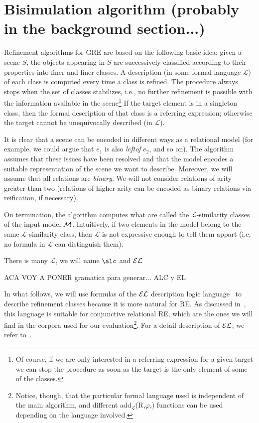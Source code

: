 \section{Bisimulation algorithm (probably in the background section...)}

Refinement algorithms for GRE are based on the following basic idea: given a 
scene $S$, the objects appearing in $S$ are successively classified according
to their properties into finer and finer classes. A description (in some formal language $\mathcal{L}$)  of each 
class is computed every time a class is refined. The procedure always stops when the 
set of classes stabilizes, i.e., no further refinement is possible with the information 
available in the scene\footnote{Of course, if we are only interested in a referring expression for 
a given target we can stop the procedure as soon as the target is the only element of some of the classes.}
If the target element is in a singleton class, then 
the formal description of that class is a referring expression; otherwise the 
target cannot be unequivocally described (in $\mathcal{L}$).  

It is clear that a scene can be encoded in different ways as a relational model (for example, we could argue that $e_1$ is also \emph{leftof} $e_2$, and so on).  The algorithm assumes that these issues have been resolved and that the model encodes a suitable representation of the scene we want to describe.  Moreover, we will assume that all relations are \emph{binary}.  We will not consider relations of arity greater than two (relations of higher arity can be encoded as binary relations via reification, if necessary).

On termination, the algorithm computes what are called the $\mathcal{L}$-similarity classes of the input model $\mathcal{M}$. Intuitively, if two elements in the model belong to the same $\mathcal{L}$-similarity class, then $\mathcal{L}$ is not expressive enough to tell them appart (i.e, no formula in $\mathcal{L}$ can distinguish them). 

There is many $\mathcal{L}$, we will name $\alc$ and $\mathcal{EL}$

ACA VOY A PONER gramatica para generar... ALC y EL

In what follows, we will use formulas of the $\mathcal{EL}$ description logic language~\cite{baad:desc03} to describe refinement classes because it is more natural for RE.  As discussed in~\cite{arec2:2008:Areces}, this language is suitable for conjunctive relational RE, which are the ones we will find in the corpora used for our evaluation\footnote{Notice, though, that the particular formal language used is independent of the main algorithm, and different add$_{\mathcal{L}}$(R,$\varphi$,\RE) functions can be used depending on the language involved.}. For a detail description of $\mathcal{EL}$, we refer to~\cite{baad:desc03}.  

